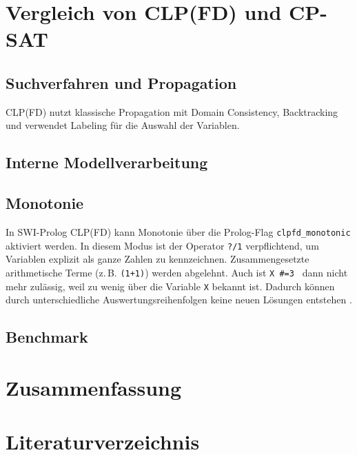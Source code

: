 \documentclass[12pt,a4paper]{article}
\begin{document}
\section{Vergleich von CLP(FD) und CP-SAT}
\subsection{Suchverfahren und Propagation}
\label{sec:search_prop}
CLP(FD) nutzt klassische Propagation mit Domain Consistency, Backtracking und verwendet Labeling für die Auswahl der Variablen.

\subsection{Interne Modellverarbeitung}
\subsection{Monotonie}
\label{sec:monotonie}

In SWI-Prolog CLP(FD) kann Monotonie über die Prolog-Flag \texttt{clpfd\_monotonic} aktiviert werden.  
In diesem Modus ist der Operator \texttt{?/1} verpflichtend, um Variablen explizit als ganze Zahlen zu kennzeichnen.
Zusammengesetzte arithmetische Terme (z.\,B. \texttt{(1+1)}) werden abgelehnt.
Auch ist \texttt{X \#=3 } dann nicht mehr zulässig, weil zu wenig über die Variable \texttt{X} bekannt ist.   
Dadurch können durch unterschiedliche Auswertungsreihenfolgen keine neuen Lösungen entstehen \cite{swi-clpfd-doc}.
\subsection{Benchmark}
\label{sec:performance}
\section{Zusammenfassung}
\section{Literaturverzeichnis}
\renewcommand*{\bibname}{} %
\renewcommand*{\refname}{} %
\printbibliography
\end{document}
